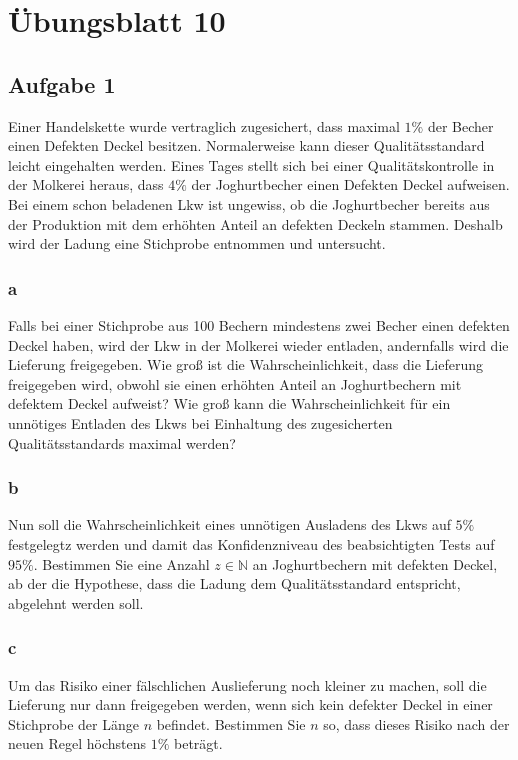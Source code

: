 \chapter{Übungsblatt 10}

\section{Aufgabe 1}

Einer Handelskette wurde vertraglich zugesichert, dass maximal $1\%$ der Becher
einen Defekten Deckel besitzen. Normalerweise kann dieser Qualitätsstandard
leicht eingehalten werden. Eines Tages stellt sich bei einer
Qualitäts\-kontrolle in der Molkerei heraus, dass $4\%$ der Joghurtbecher einen
Defekten Deckel aufweisen. Bei einem schon beladenen Lkw ist ungewiss, ob die
Joghurtbecher bereits aus der Produktion mit dem erhöhten Anteil an defekten
Deckeln stammen. Deshalb wird der Ladung eine Stichprobe entnommen und
untersucht.

\subsection{a}

Falls bei einer Stichprobe aus 100 Bechern mindestens zwei Becher einen
defekten Deckel haben, wird der Lkw in der Molkerei wieder entladen,
andernfalls wird die Lieferung freigegeben. Wie groß ist die
Wahrscheinlichkeit, dass die Lieferung freigegeben wird, obwohl sie einen
erhöhten Anteil an Joghurtbechern mit defektem Deckel aufweist? Wie groß kann
die Wahrscheinlichkeit für ein unnötiges Entladen des Lkws bei Einhaltung des
zugesicherten Qualitätsstandards maximal werden?

\subsection{b}

Nun soll die Wahrscheinlichkeit eines unnötigen Ausladens des Lkws auf $5\%$
festgelegtz werden und damit das Konfidenzniveau des beabsichtigten Tests auf
$95\%$. Bestimmen Sie eine Anzahl $z \in \mathbb{N}$ an Joghurtbechern mit
defekten Deckel, ab der die Hypothese, dass die Ladung dem Qualitätsstandard
entspricht, abgelehnt werden soll.

\subsection{c}

Um das Risiko einer fälschlichen Auslieferung noch kleiner zu machen, soll die
Lieferung nur dann freigegeben werden, wenn sich kein defekter Deckel in einer
Stichprobe der Länge $n$ befindet. Bestimmen Sie $n$ so, dass dieses Risiko
nach der neuen Regel höchstens $1\%$ beträgt.

